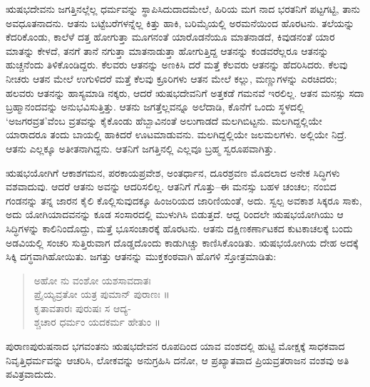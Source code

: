 ಋಷಭದೇವನು ಜಗತ್ತಿನಲ್ಲೆಲ್ಲ ಧರ್ಮವನ್ನು ಸ್ಥಾಪಿಸಿದುದಾದಮೇಲೆ, ಹಿರಿಯ ಮಗ ನಾದ ಭರತನಿಗೆ ಪಟ್ಟಗಟ್ಟಿ, ತಾನು ಅವಧೂತನಾದನು. ಆತನು ಬಟ್ಟೆಬರೆಗಳನ್ನೆಲ್ಲ ಕಿತ್ತು ಹಾಕಿ, ಬರಿಮೈಯಲ್ಲಿ ಅರಮನೆಯಿಂದ ಹೊರಟನು. ತಲೆಯನ್ನು ಕೆದರಿಕೊಂಡು, ಕಾಲೆಳೆ ದತ್ತ ಹೋಗುತ್ತಾ ಮೂಗನಂತೆ ಯಾರೊಡನೆಯೂ ಮಾತನಾಡದೆ, ಕಿವುಡನಂತೆ ಯಾರ ಮಾತನ್ನು ಕೇಳದೆ, ತನಗೆ ತಾನೆ ನಗುತ್ತಾ ಮಾತನಾಡುತ್ತಾ ಹೋಗುತ್ತಿದ್ದ ಆತನನ್ನು ಕಂಡವರೆಲ್ಲರೂ ಆತನನ್ನು ಹುಚ್ಚನೆಂದು ತಿಳಿಕೊಂಡಿದ್ದರು. ಕೆಲವರು ಆತನನ್ನು ಅಣಕಿಸಿ ದರೆ ಮತ್ತೆ ಕೆಲವರು ಆತನನ್ನು ಹೆದರಿಸಿದರು. ಕೆಲವು ನೀಚರು ಆತನ ಮೇಲೆ ಉಗುಳಿದರೆ ಮತ್ತೆ ಕೆಲವು ಕ್ರೂರಿಗಳು ಆತನ ಮೇಲೆ ಕಲ್ಲು, ಮಣ್ಣುಗಳನ್ನು ಎರಚಿದರು; ಹಲವರು ಆತನನ್ನು ಹಾಸ್ಯಮಾಡಿ ನಕ್ಕರು, ಆದರೆ ಋಷಭದೇವನಿಗೆ ಅತ್ತಕಡೆ ಗಮನವೆ ಇರಲಿಲ್ಲ. ಆತನ ಮನಸ್ಸು ಸದಾ ಬ್ರಹ್ಮಾನಂದವನ್ನು ಅನುಭವಿಸುತ್ತಿತ್ತು. ಆತನು ಜಗತ್ತೆಲ್ಲವನ್ನೂ ಅಲೆದಾಡಿ, ಕೊನೆಗೆ ಒಂದು ಸ್ಥಳದಲ್ಲಿ ‘ಅಜಗರವ್ರತ’ವೆಂಬ ವ್ರತವನ್ನು ಕೈಕೊಂಡು ಹೆಬ್ಬಾವಿನಂತೆ ಅಲುಗಾಡದೆ ಮಲಗಿಬಿಟ್ಟನು. ಮಲಗಿದ್ದಲ್ಲಿಯೇ ಯಾರಾದರೂ ತಂದು ಬಾಯಲ್ಲಿ ಹಾಕಿದರೆ ಊಟಮಾಡುವನು. ಮಲಗಿದ್ದಲ್ಲಿಯೇ ಜಲಮಲಗಳು. ಅಲ್ಲಿಯೇ ನಿದ್ರೆ. ಆತನು ಎಲ್ಲಕ್ಕೂ ಅತೀತನಾಗಿದ್ದನು. ಆತನಿಗೆ ಜಗತ್ತಿನಲ್ಲಿ ಎಲ್ಲವೂ ಬ್ರಹ್ಮ ಸ್ವರೂಪವಾಗಿತ್ತು.

ಋಷಭಯೋಗಿಗೆ ಆಕಾಶಗಮನ, ಪರಕಾಯಪ್ರವೇಶ, ಅಂತರ್ಧಾನ, ದೂರಶ್ರವಣ ಮೊದಲಾದ ಅನೇಕ ಸಿದ್ಧಿಗಳು ವಶವಾದುವು. ಆದರೆ ಆತನು ಅವನ್ನು ಆದರಿಸಲಿಲ್ಲ. ಆತನಿಗೆ ಗೊತ್ತು–ಈ ಮನಸ್ಸು ಬಹಳ ಚಂಚಲ; ನಂಬಿದ ಗಂಡನನ್ನು ತನ್ನ ಜಾರನ ಕೈಲಿ ಕೊಲ್ಲಿಸುವುದಕ್ಕೂ ಹಿಂಜರಿಯದ ಜಾರಿಣಿಯಂತೆ, ಅದು. ಸ್ವಲ್ಪ ಅವಕಾಶ ಸಿಕ್ಕರೂ ಸಾಕು, ಅದು ಯೋಗಿಯಾದವನನ್ನು ಕೂಡ ಸಂಸಾರದಲ್ಲಿ ಮುಳುಗಿಸಿ ಬಿಡುತ್ತದೆ. ಆದ್ದ ರಿಂದಲೇ ಋಷಭಯೋಗಿಯು ಆ ಸಿದ್ಧಿಗಳನ್ನು ಕಾಲಿನಿಂದೊದ್ದು, ಮತ್ತೆ ಭೂಸಂಚಾರಕ್ಕೆ ಹೊರಟನು. ಆತನು ದಕ್ಷಿಣಕರ್ಣಾಟಕದ ಕುಟಕಾಚಲಕ್ಕೆ ಬಂದು ಅಡವಿಯಲ್ಲಿ ಸಂಚರಿ ಸುತ್ತಿರುವಾಗ ದೊಡ್ಡದೊಂದು ಕಾಡುಗಿಚ್ಚು ಕಾಣಿಸಿಕೊಂಡಿತು. ಋಷಭಯೋಗಿಯ ದೇಹ ಅದಕ್ಕೆ ಸಿಕ್ಕಿ ದಗ್ಧವಾಗಿಹೋಯಿತು. ಜಗತ್ತು ಆತನನ್ನು ಮುಕ್ತಕಂಠವಾಗಿ ಹೊಗಳಿ ಸ್ತೋತ್ರಮಾಡಿತು:

\begin{verse}
ಅಹೋ ನು ವಂಶೋ ಯಶಸಾವದಾತಃ\\ಪ್ರೈಯ್ಯವ್ರತೋ ಯತ್ರ ಪುಮಾನ್ ಪುರಾಣಃ ॥\\ಕೃತಾವತಾರಃ ಪುರುಷಃ ಸ ಆದ್ಯ-\\ಶ್ಚಚಾರ ಧರ್ಮಂ ಯದಕರ್ಮ ಹೇತುಂ ॥
\end{verse}

ಪುರಾಣಪುರುಷನಾದ ಭಗವಂತನು ಋಷಭದೇವನ ರೂಪದಿಂದ ಯಾವ ವಂಶದಲ್ಲಿ ಹುಟ್ಟಿ ಮೋಕ್ಷಕ್ಕೆ ಸಾಧಕವಾದ ನಿವೃತ್ತಿಧರ್ಮವನ್ನು ಆಚರಿಸಿ, ಲೋಕವನ್ನು ಅನುಗ್ರಹಿಸಿ ದನೋ, ಆ ಪ್ರಖ್ಯಾತವಾದ ಪ್ರಿಯವ್ರತರಾಜನ ವಂಶವು ಅತಿ ಪವಿತ್ರವಾದುದು.

